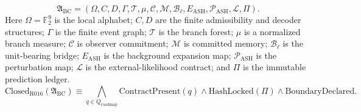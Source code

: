 \[
\mathfrak A_{\mathrm{BC}} =
(\Omega,C,D,\Gamma,\mathcal T,\mu,\mathcal C,\mathcal M,\mathcal B_\ell,
E_{\mathrm{ASH}},\mathcal P_{\mathrm{ASH}},\mathcal L,\Pi).
\]
Here \(\Omega=\mathbb F_2^9\) is the local alphabet; \(C,D\) are the finite
admissibility and decoder structures; \(\Gamma\) is the finite event graph;
\(\mathcal T\) is the branch forest; \(\mu\) is a normalized branch measure;
\(\mathcal C\) is observer commitment; \(\mathcal M\) is committed memory;
\(\mathcal B_\ell\) is the unit-bearing bridge; \(E_{\mathrm{ASH}}\) is the
background expansion map; \(\mathcal P_{\mathrm{ASH}}\) is the perturbation
map; \(\mathcal L\) is the external-likelihood contract; and \(\Pi\) is the
immutable prediction ledger.
\[
\mathrm{Closed}_{\mathrm{R016}}(\mathfrak A_{\mathrm{BC}})
\equiv
\bigwedge_{q\in Q_{\mathrm{roadmap}}}\mathrm{ContractPresent}(q)
\land
\mathrm{HashLocked}(\Pi)
\land
\mathrm{BoundaryDeclared}.
\]
